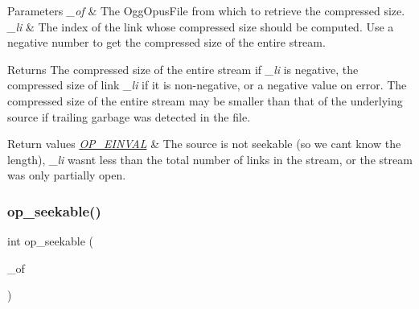 \begin{DoxyParams}{Parameters}
{\em \+\_\+of} & The {\ttfamily Ogg\+Opus\+File} from which to retrieve the compressed size. \\
\hline
{\em \+\_\+li} & The index of the link whose compressed size should be computed. Use a negative number to get the compressed size of the entire stream. \\
\hline
\end{DoxyParams}
\begin{DoxyReturn}{Returns}
The compressed size of the entire stream if {\itshape \+\_\+li} is negative, the compressed size of link {\itshape \+\_\+li} if it is non-\/negative, or a negative value on error. The compressed size of the entire stream may be smaller than that of the underlying source if trailing garbage was detected in the file. 
\end{DoxyReturn}

\begin{DoxyRetVals}{Return values}
{\em \hyperlink{group__error__codes_gae0879acafe9cc0ab72462d291fdb6fb6}{O\+P\+\_\+\+E\+I\+N\+V\+AL}} & The source is not seekable (so we can\textquotesingle{}t know the length), {\itshape \+\_\+li} wasn\textquotesingle{}t less than the total number of links in the stream, or the stream was only partially open. \\
\hline
\end{DoxyRetVals}
\mbox{\label{group__stream__info_ga9272a4a6ac9e01fbc549008f5ff58b4c}} 
\subsubsection{\texorpdfstring{op\+\_\+seekable()}{op\_seekable()}}
{\footnotesize\ttfamily int op\+\_\+seekable (\begin{DoxyParamCaption}\item[{\hyperlink{zconf_8h_a2c212835823e3c54a8ab6d95c652660e}{const} Ogg\+Opus\+File $\ast$}]{\+\_\+of }\end{DoxyParamCaption})}

